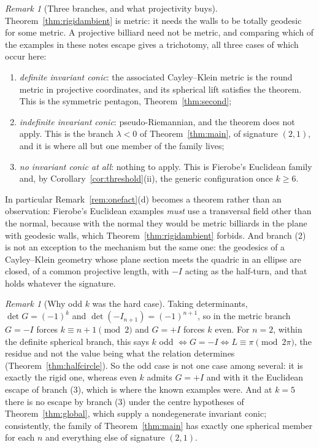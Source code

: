 \documentclass[11pt,a4paper]{article}
\theoremstyle{plain}
\theoremstyle{definition}
\theoremstyle{remark}
\newtheorem{remark}[theorem]{Remark}
\begin{document}
\begin{remark}[Three branches, and what projectivity buys]\label{rem:branches}
Theorem~\ref{thm:rigidambient} is metric: it needs the walls to be totally geodesic
for some metric. A projective billiard need not be metric, and comparing which of
the examples in these notes escape gives a trichotomy, all three cases of which
occur here:
\begin{enumerate}[label=\textup{(\arabic*)},nosep]
  \item \emph{definite invariant conic}: the associated Cayley--Klein metric is the
        round metric in projective coordinates, and its spherical lift
        satisfies the theorem. This is the symmetric pentagon,
        Theorem~\ref{thm:second};
  \item \emph{indefinite invariant conic}: pseudo-Riemannian, and the theorem does
        not apply. This is the branch $\lambda<0$ of Theorem~\ref{thm:main}, of
        signature $(2,1)$, and it is where all but one member of the family lives;
  \item \emph{no invariant conic at all}: nothing to apply. This is Fierobe's
        Euclidean family and, by Corollary~\ref{cor:threshold}(ii), the generic
        configuration once $k\ge6$.
\end{enumerate}
In particular Remark~\ref{rem:onefact}(d) becomes a theorem rather than an
observation: Fierobe's Euclidean examples \emph{must} use a transversal field other
than the normal, because with the normal they would be metric billiards in the plane
with geodesic walls, which Theorem~\ref{thm:rigidambient} forbids. And branch (2) is
not an exception to the mechanism but the same one: the geodesics of a Cayley--Klein
geometry whose plane section meets the quadric in an ellipse are closed, of a common
projective length, with $-I$ acting as the half-turn, and that holds whatever the
signature.
\end{remark}

\begin{remark}[Why odd $k$ was the hard case]
Taking determinants, $\det G=(-1)^k$ and $\det(-I_{n+1})=(-1)^{n+1}$, so in the
metric branch $G=-I$ forces $k\equiv n+1\pmod 2$ and $G=+I$ forces $k$ even. For
$n=2$, within the definite spherical branch, this says
$k$ odd $\iff G=-I\iff L\equiv\pi\pmod{2\pi}$, the residue and not the value
being what the relation determines (Theorem~\ref{thm:halfcircle}). So the odd case is not one case among several: it is
exactly the rigid one, whereas even $k$ admits $G=+I$ and with it the Euclidean
escape of branch (3), which is where the known examples were. And at $k=5$ there is
no escape by branch (3) under the centre hypotheses of
Theorem~\ref{thm:global}, which supply a nondegenerate invariant conic; consistently, the family of Theorem~\ref{thm:main}
has exactly one spherical member for each $n$ and everything else of signature
$(2,1)$.
\end{remark}
\end{document}
